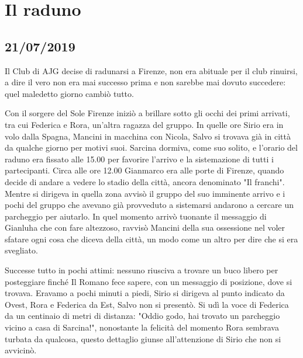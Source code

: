 \section{Il raduno}
\subsection*{21/07/2019}



Il Club di AJG decise di radunarsi a Firenze, non era abituale per il club rinuirsi, a dire il vero non era mai successo prima e non sarebbe mai dovuto succedere: quel maledetto giorno cambiò tutto.

Con il sorgere del Sole Firenze iniziò a brillare sotto gli occhi dei primi arrivati, tra cui Federica e Rora, un'altra ragazza del gruppo. In quelle ore Sirio era in volo dalla Spagna, Mancini in macchina con Nicola, Salvo si trovava già in città da qualche giorno per motivi suoi.
Sarcina dormiva, come suo solito, e l'orario del raduno era fissato alle 15.00 per favorire l'arrivo e la sistemazione di tutti i partecipanti.
Circa alle ore 12.00 Gianmarco era alle porte di Firenze, quando decide di andare a vedere lo stadio della città, ancora denominato "Il franchi". Mentre si dirigeva in quella zona avvisò il gruppo del suo imminente arrivo e i pochi del gruppo che avevano già provveduto a sistemarsi andarono a cercare un parcheggio per aiutarlo. In quel momento arrivò tuonante il messaggio di Gianluha che con fare altezzoso, ravvisò Mancini della sua ossessione nel voler sfatare ogni cosa che diceva della città, un modo come un altro per dire che si era svegliato.

Successe tutto in pochi attimi: nessuno riusciva a trovare un buco libero per posteggiare finché Il Romano fece sapere, con un messaggio di posizione, dove si trovava. Eravamo a pochi minuti a piedi, Sirio si dirigeva al punto indicato da Ovest, Rora e Federica da Est, Salvo non si presentò. Si udì la voce di Federica da un centinaio di metri di distanza: "Oddio godo, hai trovato un parcheggio vicino a casa di Sarcina!", nonostante la felicità del momento Rora sembrava turbata da qualcosa, questo dettaglio giunse all'attenzione di Sirio che non si avvicinò. 

